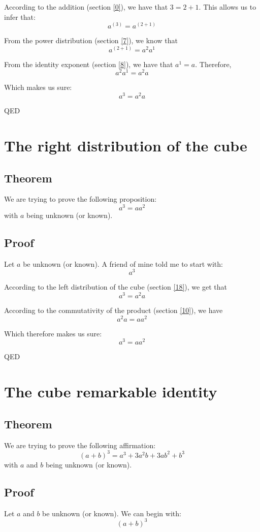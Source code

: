 \documentclass[a4paper]{article}
\begin{document}
According to the addition (section \ref{0}), we have that $3=2+1$. This allows us to infer that:
\[a^{\left(3\right)}=a^{\left(2+1\right)}\]

From the power distribution (section \ref{7}), we know that
\[a^{\left(2+1\right)}=a^2a^1\]

From the identity exponent (section \ref{8}), we have that $a^1=a$. Therefore,
\[a^2a^1=a^2a\]

Which makes us sure:
\[a^3 = a^2a\]
\begin{flushright}
QED
\end{flushright}



\section{The right distribution of the cube\label{17}}
\subsection{Theorem}
We are trying to prove the following proposition:
\[a^3 = aa^2\]
with $a$ being unknown (or known).\subsection{Proof}
Let $a$ be unknown (or known). A friend of mine told me to start with:
\[a^3\]

According to the left distribution of the cube (section \ref{18}), we get that
\[a^3=a^2a\]

According to the commutativity of the product (section \ref{10}), we have
\[a^2a=aa^2\]

Which therefore makes us sure:
\[a^3 = aa^2\]
\begin{flushright}
QED
\end{flushright}



\section{The cube remarkable identity\label{19}}
\subsection{Theorem}
We are trying to prove the following affirmation:
\[\left(a + b\right)^3 = a^3 + 3a^2b + 3ab^2 + b^3\]
with $a$ and $b$ being unknown (or known).\subsection{Proof}
Let $a$ and $b$ be unknown (or known). We can begin with:
\[\left(a+b\right)^3\]
\end{document}
